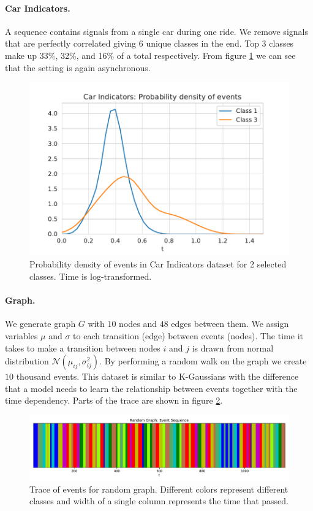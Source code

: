 \paragraph{Car Indicators.}
A sequence contains signals from a single car during one ride. We remove signals that are perfectly correlated giving 6 unique classes in the end. Top 3 classes make up 33\%, 32\%, and 16\% of a total respectively. From figure \ref{fig:car-indicators-density} we can see that the setting is again asynchronous.
\begin{figure}[H]
    \centering
    \includegraphics[width=0.35 \linewidth]{sections/010_neurips2019/paper/images/car-indicators-density.pdf}
    \caption{Probability density of events in Car Indicators dataset for 2 selected classes. Time is log-transformed.}\label{fig:car-indicators-density}
\end{figure}

\paragraph{Graph.}

We generate graph $G$ with $10$ nodes and $48$ edges between them. We assign variables $\mu$ and $\sigma$ to each transition (edge) between events (nodes). The time it takes to make a transition between nodes $i$ and $j$ is drawn from normal distribution $\mathcal{N}(\mu_{ij}, \sigma^2_{ij})$. By performing a random walk on the graph we create $10$ thousand events. This dataset is similar to K-Gaussians with the difference that a model needs to learn the relationship between events together with the time dependency. Parts of the trace are shown in figure \ref{fig:random-graph-trace}.
\begin{figure}[H]
    \centering
    \includegraphics[width=\linewidth]{sections/010_neurips2019/paper/images/random-graph-trace.pdf}
    \caption{Trace of events for random graph. Different colors represent different classes and width of a single column represents the time that passed.}\label{fig:random-graph-trace}
\end{figure}
